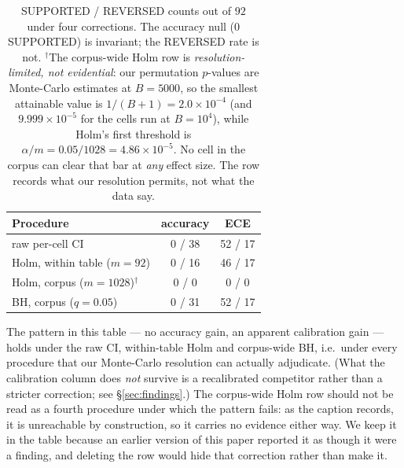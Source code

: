\documentclass[11pt]{article}
\begin{document}
\begin{table}[h]
\centering\small
\setlength{\tabcolsep}{4pt}
\caption{SUPPORTED / REVERSED counts out of $92$ under four corrections. The accuracy null
($0$ SUPPORTED) is invariant; the REVERSED rate is not. $^{\dagger}$The corpus-wide Holm row
is \emph{resolution-limited, not evidential}: our permutation $p$-values are Monte-Carlo
estimates at $B{=}5000$, so the smallest attainable value is $1/(B{+}1){=}2.0\times10^{-4}$
(and $9.999\times10^{-5}$ for the cells run at $B{=}10^4$), while Holm's first threshold is
$\alpha/m = 0.05/1028 = 4.86\times10^{-5}$. No cell in the corpus can clear that bar at
\emph{any} effect size. The row records what our resolution permits, not what the data say.}
\label{tab:correction}
\begin{tabular}{@{}lcc@{}}
\toprule
Procedure & accuracy & ECE \\
\midrule
raw per-cell CI              & 0 / 38 & 52 / 17 \\
Holm, within table ($m{=}92$)  & 0 / 16 & 46 / 17 \\
Holm, corpus ($m{=}1028$)$^{\dagger}$ & 0 / 0  & 0 / 0  \\
BH, corpus ($q{=}0.05$)        & 0 / 31 & 52 / 17 \\
\bottomrule
\end{tabular}
\end{table}

The pattern in this table --- no accuracy gain, an apparent calibration gain --- holds under
the raw CI, within-table Holm and corpus-wide BH, i.e.\ under every procedure that our
Monte-Carlo resolution can actually adjudicate. (What the calibration column does \emph{not}
survive is a recalibrated competitor rather than a stricter correction; see
\S\ref{sec:findings}.) The corpus-wide Holm row should not be read as a fourth procedure
under which the pattern fails: as the caption records, it is unreachable by
construction, so it carries no evidence either way. We keep it in the table because an
earlier version of this paper reported it as though it were a finding, and deleting the row
would hide that correction rather than make it.
\end{document}
